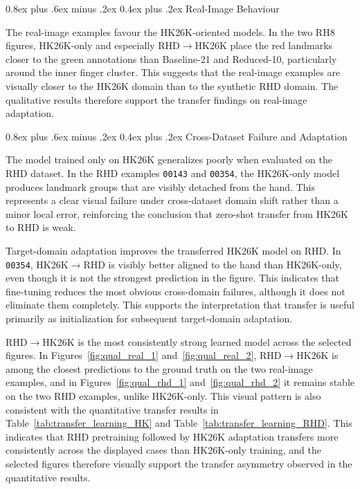 ﻿\documentclass[10pt,letterpaper]{article}
\makeatletter
\renewcommand\subsubsection{\@startsection{subsubsection}{3}{\z@}%
  {0.8ex plus .6ex minus .2ex}%
  {0.4ex plus .2ex}%
  {\normalfont\small\itshape}}
\makeatother
\begin{document}
\subsubsection{Real-Image Behaviour}

\medskip
\noindent
The real-image examples favour the HK26K-oriented models. In the two RH8 figures, HK26K-only and especially RHD$\rightarrow$HK26K place the red landmarks closer to the green annotations than Baseline-21 and Reduced-10, particularly around the inner finger cluster. This suggests that the real-image examples are visually closer to the HK26K domain than to the synthetic RHD domain. The qualitative results therefore support the transfer findings on real-image adaptation.

\subsubsection{Cross-Dataset Failure and Adaptation}

\medskip
\noindent
The model trained only on HK26K generalizes poorly when evaluated on the RHD dataset. In the RHD examples \texttt{00143} and \texttt{00354}, the HK26K-only model produces landmark groups that are visibly detached from the hand. This represents a clear visual failure under cross-dataset domain shift rather than a minor local error, reinforcing the conclusion that zero-shot transfer from HK26K to RHD is weak.

\medskip
\noindent
Target-domain adaptation improves the transferred HK26K model on RHD. In \texttt{00354}, HK26K$\rightarrow$RHD is visibly better aligned to the hand than HK26K-only, even though it is not the strongest prediction in the figure. This indicates that fine-tuning reduces the most obvious cross-domain failures, although it does not eliminate them completely. This supports the interpretation that transfer is useful primarily as initialization for subsequent target-domain adaptation.

\medskip
\noindent
RHD$\rightarrow$HK26K is the most consistently strong learned model across the selected figures. In Figures~\ref{fig:qual_real_1} and~\ref{fig:qual_real_2}, RHD$\rightarrow$HK26K is among the closest predictions to the ground truth on the two real-image examples, and in Figures~\ref{fig:qual_rhd_1} and~\ref{fig:qual_rhd_2} it remains stable on the two RHD examples, unlike HK26K-only. This visual pattern is also consistent with the quantitative transfer results in Table~\ref{tab:transfer_learning_HK} and Table~\ref{tab:transfer_learning_RHD}. This indicates that RHD pretraining followed by HK26K adaptation transfers more consistently across the displayed cases than HK26K-only training, and the selected figures therefore visually support the transfer asymmetry observed in the quantitative results.
\end{document}
